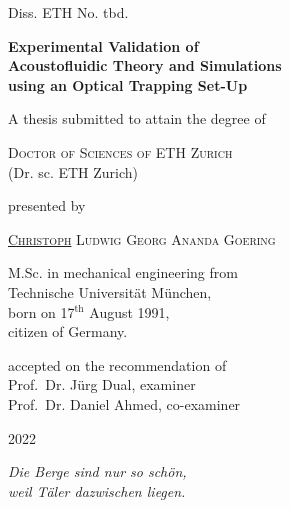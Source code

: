 \begin{titlepage}
{Diss. ETH No. tbd. \vspace{2.5cm}}
\begin{center}
\Large{\textbf{Experimental Validation of\\ Acoustofluidic Theory and 
Simulations\\ using an Optical Trapping Set-Up}}
\end{center}
\vspace{2.0cm}
\begin{center}
{A thesis submitted to attain the degree of}
\end{center}
\begin{center}
{\textsc{Doctor of Sciences of ETH Zurich}}\\
{(Dr. sc. ETH Zurich)}
\end{center}
\vspace{10mm}
\begin{center}
{presented by}
\end{center}
\begin{center}
  {\textsc{\underline{Christoph} Ludwig Georg Ananda Goering}}
\end{center}
\begin{center}
{M.Sc. in mechanical engineering from\\
Technische Universit\"at M\"unchen,\\
born on 17$^{\text{th}}$ August 1991,\\
citizen of Germany.}
\end{center}
\vspace{10mm}
\begin{center}
{accepted on the recommendation of \\ \vspace{0.3cm}
Prof.\ Dr. J\"urg Dual, examiner \\
Prof.\ Dr. Daniel Ahmed, co-examiner}
\end{center}
\vspace{5mm}
\begin{center}
2022
\end{center}

\cleardoublepage
\thispagestyle{empty}
\vspace*{5.0cm}

\begin{flushright}
\vspace*{0.5cm}
\large
\textit{Die Berge sind nur so schön,\\ weil Täler dazwischen liegen.}

\end{flushright}

\clearpage
\cleardoublepage
\end{titlepage}
